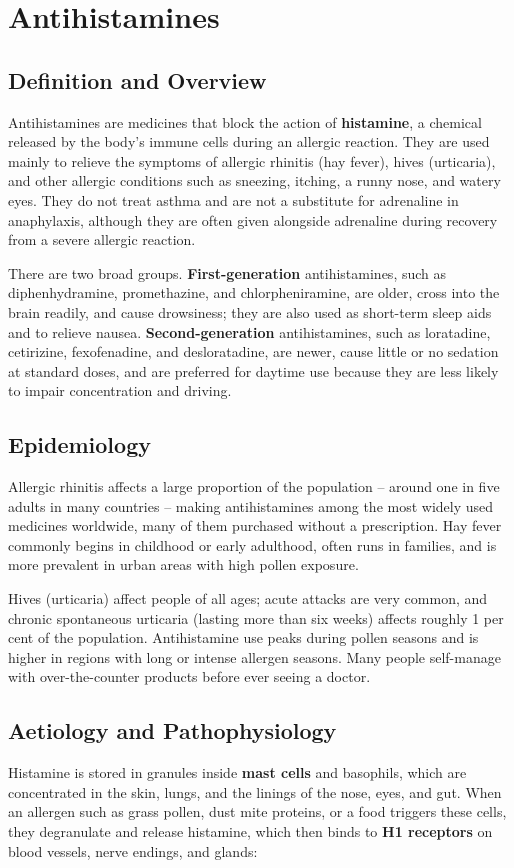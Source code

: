 \chapter{Antihistamines}

\section*{Definition and Overview}
Antihistamines are medicines that block the action of \textbf{histamine}, a chemical released by the body's immune cells during an allergic reaction. They are used mainly to relieve the symptoms of allergic rhinitis (hay fever), hives (urticaria), and other allergic conditions such as sneezing, itching, a runny nose, and watery eyes. They do not treat asthma and are not a substitute for adrenaline in anaphylaxis, although they are often given alongside adrenaline during recovery from a severe allergic reaction.

There are two broad groups. \textbf{First-generation} antihistamines, such as diphenhydramine, promethazine, and chlorpheniramine, are older, cross into the brain readily, and cause drowsiness; they are also used as short-term sleep aids and to relieve nausea. \textbf{Second-generation} antihistamines, such as loratadine, cetirizine, fexofenadine, and desloratadine, are newer, cause little or no sedation at standard doses, and are preferred for daytime use because they are less likely to impair concentration and driving.

\section*{Epidemiology}
Allergic rhinitis affects a large proportion of the population -- around one in five adults in many countries -- making antihistamines among the most widely used medicines worldwide, many of them purchased without a prescription. Hay fever commonly begins in childhood or early adulthood, often runs in families, and is more prevalent in urban areas with high pollen exposure.

Hives (urticaria) affect people of all ages; acute attacks are very common, and chronic spontaneous urticaria (lasting more than six weeks) affects roughly 1 per cent of the population. Antihistamine use peaks during pollen seasons and is higher in regions with long or intense allergen seasons. Many people self-manage with over-the-counter products before ever seeing a doctor.

\section*{Aetiology and Pathophysiology}
Histamine is stored in granules inside \textbf{mast cells} and basophils, which are concentrated in the skin, lungs, and the linings of the nose, eyes, and gut. When an allergen such as grass pollen, dust mite proteins, or a food triggers these cells, they degranulate and release histamine, which then binds to \textbf{H1 receptors} on blood vessels, nerve endings, and glands:

